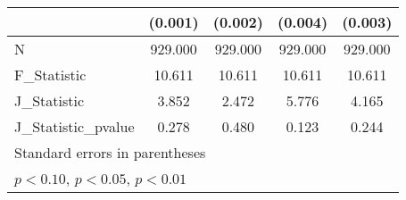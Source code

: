 {\begin{tabular}{l*{4}{c}}
            &     (0.001)         &     (0.002)         &     (0.004)         &     (0.003)         \\
\hline
N           &     929.000         &     929.000         &     929.000         &     929.000         \\
F\_Statistic &      10.611         &      10.611         &      10.611         &      10.611         \\
J\_Statistic &       3.852         &       2.472         &       5.776         &       4.165         \\
J\_Statistic\_pvalue&       0.278         &       0.480         &       0.123         &       0.244         \\
\hline\hline
\multicolumn{5}{l}{\footnotesize Standard errors in parentheses}\\
\multicolumn{5}{l}{\footnotesize \sym{*} \(p<0.10\), \sym{**} \(p<0.05\), \sym{***} \(p<0.01\)}\\
\end{tabular}
}
